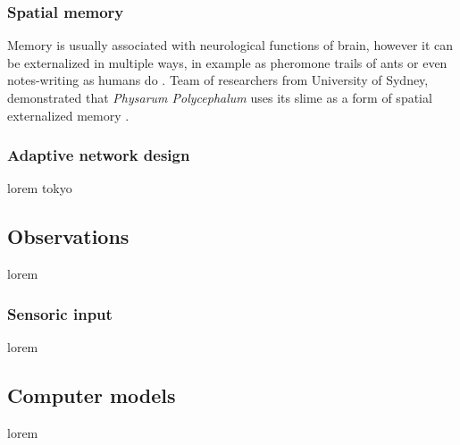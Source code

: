 \subsubsection{Spatial memory}

Memory is usually associated with neurological functions of brain, however it can be externalized in multiple ways, in example as pheromone trails of ants \cite{carroll1973ecology} or even notes-writing as humans do \cite{fisher1973effect}. Team of researchers from University of Sydney, demonstrated that \textit{Physarum Polycephalum} uses its slime as a form of spatial externalized memory \cite{reid2012slime}.



\subsubsection{Adaptive network design}

lorem tokyo


\subsection{Observations}

lorem


\subsubsection{Sensoric input}

lorem


\subsection{Computer models}

lorem


